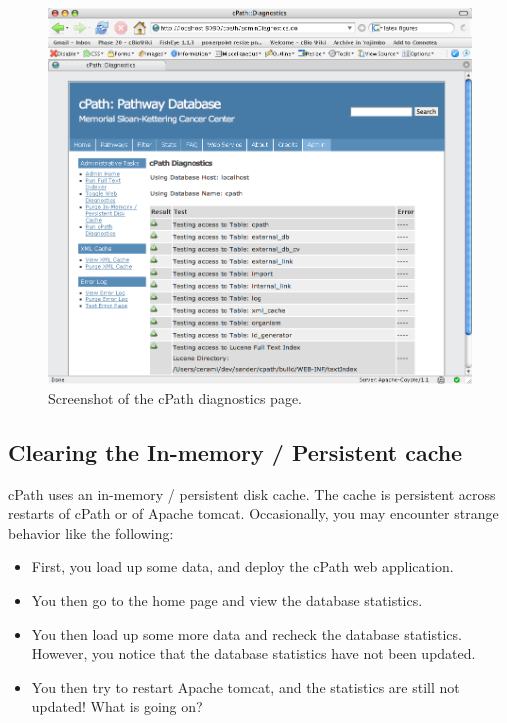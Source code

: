 \documentclass[letterpaper,12pt]{article}
\begin{document}
\begin{figure}
  \includegraphics[scale=0.3]{figures/cpath_diagnostics.png}
  \caption{Screenshot of the cPath diagnostics page.}
\label{cpath-diagnostics}
\end{figure}

\subsection{Clearing the In-memory / Persistent cache}
\label{purge-cache}

cPath uses an in-memory / persistent disk cache.  The cache is persistent across restarts of cPath or of Apache tomcat.  Occasionally, you may encounter strange behavior like the following:

\begin{itemize}

\item First, you load up some data, and deploy the cPath web application.

\item You then go to the home page and view the database statistics.

\item You then load up some more data and recheck the database statistics.  However, you notice that the database statistics have not been updated.

\item You then try to restart Apache tomcat, and the statistics are still not updated!  What is going  on?

\end{itemize}
\end{document}
